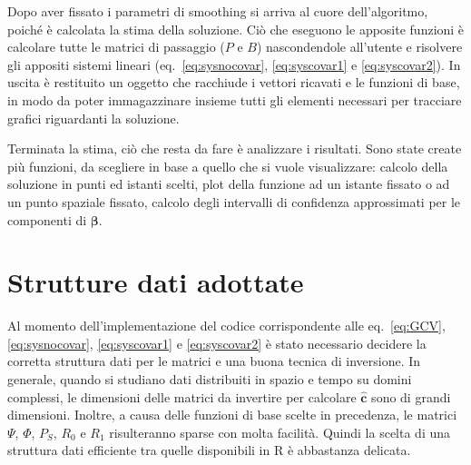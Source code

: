 \documentclass[a4paper,11pt,twoside,openright]{book}							%
\begin{document}
Dopo aver fissato i parametri di smoothing si arriva al cuore dell'algoritmo, poiché è calcolata la stima della soluzione. Ciò che eseguono le apposite funzioni è calcolare tutte le matrici di passaggio ($P$ e $B$) nascondendole all'utente e risolvere gli appositi sistemi lineari (eq.~\eqref{eq:sysnocovar}, \eqref{eq:syscovar1} e \eqref{eq:syscovar2}). In uscita è restituito un oggetto che racchiude i vettori ricavati e le funzioni di base, in modo da poter immagazzinare insieme tutti gli elementi necessari per tracciare grafici riguardanti la soluzione.

Terminata la stima, ciò che resta da fare è analizzare i risultati. Sono state create più funzioni, da scegliere in base a quello che si vuole visualizzare: calcolo della soluzione in punti ed istanti scelti, plot della funzione ad un istante fissato o ad un punto spaziale fissato, calcolo degli intervalli di confidenza approssimati per le componenti di $\bm{\beta}$.

\section{Strutture dati adottate}
Al momento dell'implementazione del codice corrispondente alle eq.~\eqref{eq:GCV}, \eqref{eq:sysnocovar}, \eqref{eq:syscovar1} e \eqref{eq:syscovar2} è stato necessario decidere la corretta struttura dati per le matrici e una buona tecnica di inversione. In generale, quando si studiano dati distribuiti in spazio e tempo su domini complessi, le dimensioni delle matrici da invertire per calcolare $\hat{\bm{c}}$ sono di grandi dimensioni. Inoltre, a causa delle funzioni di base scelte in precedenza, le matrici $\Psi$, $\Phi$, $P_S$, $R_0$ e $R_1$ risulteranno sparse con molta facilità. Quindi la scelta di una struttura dati efficiente tra quelle disponibili in R è abbastanza delicata.
\end{document}
